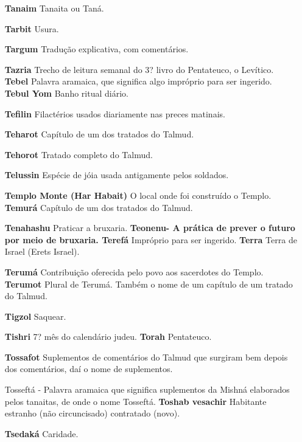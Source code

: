 \begin{itemize}
\item[\textbf{Tanaim}] Tanaita ou Taná.

\item[\textbf{Tarbit}] Usura.

\item[\textbf{Targum}] Tradução explicativa, com comentários.

\item[\textbf{Tazria}] Trecho de leitura semanal do 3? livro do Pentateuco, o
Levítico. \textbf{Tebel} Palavra aramaica, que signifi­ca algo
impróprio para ser ingerido. \textbf{Tebul Yom} Banho ritual diário.
\item[\textbf{Tefilin}] Filactérios usados diariamen­te nas preces matinais.

\item[\textbf{Teharot}] Capítulo de um dos tratados do Talmud.

\item[\textbf{Tehorot}] Tratado completo do Tal­mud.

\item[\textbf{Telussin}] Espécie de jóia usada anti­gamente pelos soldados.

\item[\textbf{Templo Monte (Har Habait)}] O lo­cal onde foi construído o
Templo. \textbf{Temurá} Capítulo de um dos tratados do Talmud.

\item[\textbf{Tenahashu}] Praticar a bruxaria. \textbf{Teonenu- A prática de
prever o fu­turo por meio de bruxaria. Terefá} Impróprio para ser
ingerido. \textbf{Terra} Terra de Israel (Erets Israel).
\item[\textbf{Terumá}] Contribuição oferecida pe­lo povo aos sacerdotes do
Templo. \textbf{Terumot} Plural de Terumá. Também o nome de um
capítulo de um tratado do Talmud.

\item[\textbf{Tigzol}] Saquear.

\item[\textbf{Tishri} 7? mês do calendário judeu. \textbf{Torah}]
Pentateuco.

\item[\textbf{Tossafot}] Suplementos de comentá­rios do Talmud que surgiram
bem de­pois dos comentários, daí o nome de suplementos.

Tosseftá - Palavra aramaica que signifi­ca suplementos da Mishná
elaborados pelos tanaitas, de onde o nome Tosseftá. \textbf{Toshab
vesachir} Habitante estranho (não circuncisado) contratado (novo).
\item[\textbf{Tsedaká}] Caridade.


\end{itemize}
